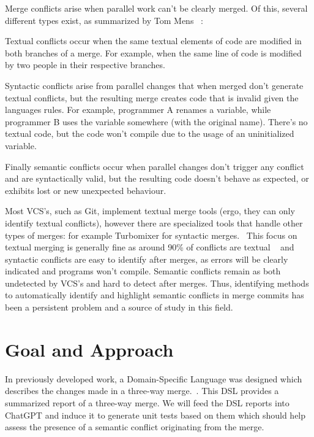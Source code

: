 Merge conflicts arise when parallel work can't be clearly merged. Of this, several different types exist, as summarized by Tom Mens ~\citep{kn:tmens}:

Textual conflicts occur when the same textual elements of code are modified in both branches of a merge. For example, when the same line of code is modified by two people in their respective branches.

Syntactic conflicts arise from parallel changes that when merged don't generate textual conflicts, but the resulting merge creates code that is invalid given the languages rules. For example, programmer A renames a variable, while programmer B uses the variable somewhere (with the original name). There's no textual code, but the code won't compile due to the usage of an uninitialized variable.

Finally semantic conflicts occur when parallel changes don't trigger any conflict and are syntactically valid, but the resulting code doesn't behave as expected, or exhibits lost or new unexpected behaviour.

Most VCS's, such as Git, implement textual merge tools (ergo, they can only identify textual conflicts), however there are specialized tools that handle other types of merges: for example Turbomixer for syntactic merges.~\citep{kn:tmens} This focus on textual merging is generally fine as around 90\% of conflicts are textual ~\citep{kn:lcsd} and syntactic conflicts are easy to identify after merges, as errors will be clearly indicated and programs won't compile.
Semantic conflicts remain as both undetected by VCS's and hard to detect after merges. Thus, identifying methods to automatically identify and highlight semantic conflicts in merge commits has been a persistent problem and a source of study in this field. ~\citep{kn:nuno} ~\citep{kn:leuson} ~\citep{kn:leuson2}



\section{Goal and Approach} \label{sec:approach}

In previously developed work, a Domain-Specific Language was designed which describes the changes made in a three-way merge.~\citep{kn:nuno}. This DSL provides a summarized report of a three-way merge. We will feed the DSL reports into ChatGPT and induce it to generate unit tests based on them which should help assess the presence of a semantic conflict originating from the merge.






